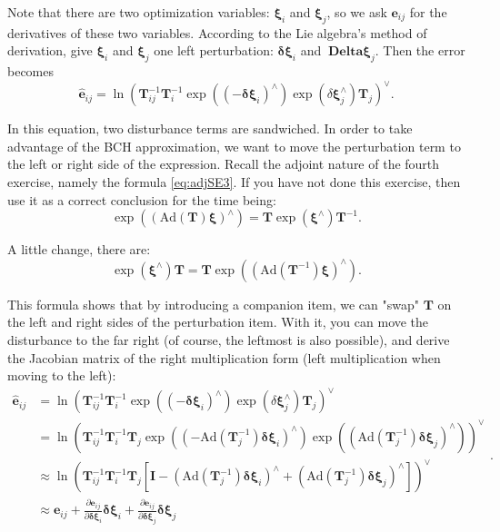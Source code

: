 Note that there are two optimization variables: $\bm{\xi}_i$ and $\bm{\xi}_j$, so we ask $\bm{e}_{ij}$ for the derivatives of these two variables. According to the Lie algebra's method of derivation, give $\bm{\xi}_i$ and $\bm{\xi}_j$ one left perturbation: $ \bm{\delta \xi}_i$ and $ \bm{\ Delta \xi}_j$. Then the error becomes
\begin{equation}
\hat{ \bm{e}}_{ij} = \ln \left( \bm{T}_{ij}^{-1}  \bm{T}_i^{-1} \exp((-\bm{\delta \xi}_i)^\wedge) \exp(\delta \bm{\xi}_j^\wedge) \bm{T}_j  \right)^\vee.
\end{equation}

In this equation, two disturbance terms are sandwiched. In order to take advantage of the BCH approximation, we want to move the perturbation term to the left or right side of the expression. Recall the adjoint nature of the fourth exercise, namely the formula \eqref{eq:adjSE3}. If you have not done this exercise, then use it as a correct conclusion for the time being:
\begin{equation}
\exp \left( \left( \mathrm{Ad}(\bm{T}) \bm{\xi} \right) ^\wedge \right) = \bm{T} \exp(\bm{\xi}^\wedge)\bm{T}^{-1}.
\end{equation}

A little change, there are:
\begin{equation}
\exp(\bm{\xi}^\wedge)\bm{T} = \bm{T} \exp \left( \left( \mathrm{Ad}(\bm{T}^{-1}) \bm{\xi} \right) ^\wedge \right) .
\end{equation}

This formula shows that by introducing a companion item, we can "swap" $\bm{T}$ on the left and right sides of the perturbation item. With it, you can move the disturbance to the far right (of course, the leftmost is also possible), and derive the Jacobian matrix of the right multiplication form (left multiplication when moving to the left):
\begin{equation}
\begin{aligned}
\hat{ \bm{e}}_{ij} &= \ln \left( \bm{T}_{ij}^{-1}  \bm{T}_i^{-1} \exp((-\bm{\delta \xi}_i)^\wedge) \exp(\delta \bm{\xi}_j^\wedge) \bm{T}_j  \right)^\vee\\
&= \ln \left( \bm{T}_{ij}^{-1} \bm{T}_i^{-1} \bm{T}_j \exp \left( \left(- \mathrm{Ad}(\bm{T}_j^{-1}) \bm{\delta \xi}_i \right)^\wedge \right) \exp \left( \left( \mathrm{Ad}(\bm{T}_j^{-1})  \bm{\delta\xi}_j\right)^\wedge \right) \right)^\vee \\ 
&\approx \ln \left( \bm{T}_{ij}^{-1} \bm{T}_i^{-1} \bm{T}_j \left[ \bm{I} - (\mathrm{Ad}(\bm{T}_j^{-1}) \bm{\delta \xi}_i)^\wedge + (\mathrm{Ad}(\bm{T}_j^{-1})  \bm{\delta \xi}_j)^{\wedge} \right] \right)^\vee \\
& \approx \bm{e}_{ij} + \frac{\partial \bm{e}_{ij}}{\partial \bm{\delta \xi}_i} \bm{\delta \xi}_i + \frac{\partial \bm{e}_{ij}}{\partial \bm{\delta \xi}_j} \bm{\delta \xi}_j
\end{aligned}.
\end{equation}

